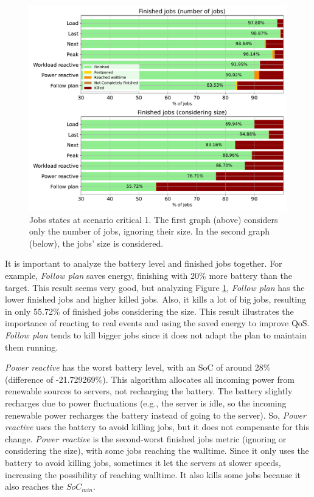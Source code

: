 \begin{figure}[!htb]
    \centering
    \includegraphics[scale=0.55]{Images/Compensations/jobs_critical_1.pdf}
    \caption{Jobs states at scenario critical 1. The first graph (above) considers only the number of jobs, ignoring their size. In the second graph (below), the jobs' size is considered.}
    \label{fig:jobs_critical_1}
\end{figure}

It is important to analyze the battery level and finished jobs together. For example, \emph{Follow plan} saves energy, finishing with 20\% more battery than the target. This result seems very good, but analyzing Figure \ref{fig:jobs_critical_1}, \emph{Follow plan} has the lower finished jobs and higher killed jobs. Also, it kills a lot of big jobs, resulting in only 55.72\% of finished jobs considering the size. This result illustrates the importance of reacting to real events and using the saved energy to improve QoS. \emph{Follow plan} tends to kill bigger jobs since it does not adapt the plan to maintain them running.

\emph{Power reactive} has the worst battery level, with an SoC of around 28\% (difference of -21.729269\%). This algorithm allocates all incoming power from renewable sources to servers, not recharging the battery. The battery slightly recharges due to power fluctuations (e.g., the server is idle, so the incoming renewable power recharges the battery instead of going to the server). So, \emph{Power reactive} uses the battery to avoid killing jobs, but it does not compensate for this change. \emph{Power reactive} is the second-worst finished jobs metric (ignoring or considering the size), with some jobs reaching the walltime. Since it only uses the battery to avoid killing jobs, sometimes it let the servers at slower speeds, increasing the possibility of reaching walltime. It also kills some jobs because it also reaches the $SoC_{min}$.

